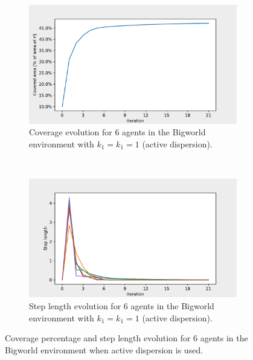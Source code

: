 \begin{figure}[H]
  \centering
  \begin{subfigure}[t]{0.5\textwidth}
    \centering
    \includegraphics[width=\textwidth]{figs/bigworld_6_agnt_k_1_1_k_2_1_area_traj.pdf}
    \caption{Coverage evolution for 6 agents in the Bigworld environment with $k_{1} = k_{1} = 1$ (active dispersion).}
    \label{fig:6_agnt_bw_k_1_1_a_traj}
  \end{subfigure}%
  ~ 
  \begin{subfigure}[t]{0.5\textwidth}
    \centering
    \includegraphics[width=\textwidth]{figs/bigworld_6_agnt_k_1_1_k_2_1_step_traj.pdf}
    \caption{Step length evolution for 6 agents in the Bigworld environment with $k_{1} = k_{1} = 1$ (active dispersion).}
    \label{fig:6_agnt_bw_k_1_1_s_traj}
  \end{subfigure}
  \caption{Coverage percentage and step length evolution for 6 agents in the Bigworld environment when active dispersion is used.}
  \label{fig:6_agnt_bw_evolution_active}
\end{figure}


